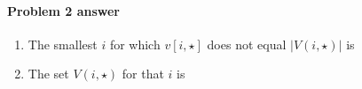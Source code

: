 \paragraph{Problem 2 answer}

\begin{enumerate}[label=(\alph*)]

\item[(a)]

  The smallest $i$ for which $v[i, \star]$ does not equal $|V(i, \star)|$ is
  \BLUE{\[
      i = \REPLACEME
    \]}

\item[(b)]

  The set $V(i,\star)$ for that $i$ is
  \BLUE{\[
      V(i, \star) = \{
      \REPLACEME
      \}
    \]}

\end{enumerate}

\continued

